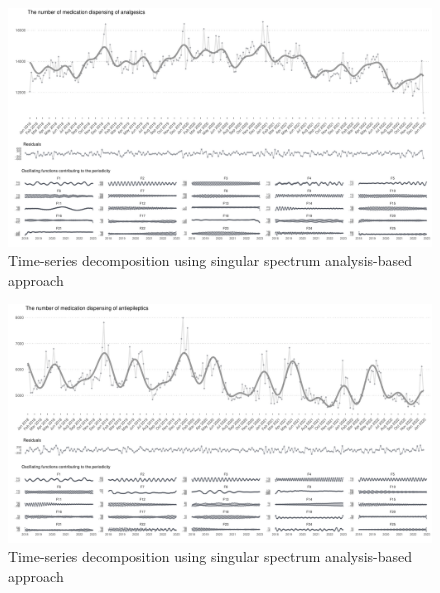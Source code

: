 \documentclass[
  letterpaper,
  DIV=11,
  numbers=noendperiod]{scrartcl}
\begin{document}
\begin{figure}[H]

{\centering \includegraphics[width=1\linewidth,height=\textheight,keepaspectratio]{supplementary_files/figure-pdf/unnamed-chunk-2-11.pdf}

}

\caption{Time-series decomposition using singular spectrum
analysis-based approach}

\end{figure}%

\begin{figure}[H]

{\centering \includegraphics[width=1\linewidth,height=\textheight,keepaspectratio]{supplementary_files/figure-pdf/unnamed-chunk-2-12.pdf}

}

\caption{Time-series decomposition using singular spectrum
analysis-based approach}

\end{figure}%
\end{document}
